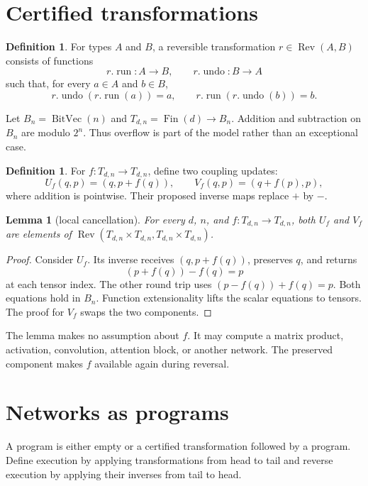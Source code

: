 \documentclass[aop,preprint]{../aop-template/imsart}
\newtheorem{lemma}[theorem]{Lemma}
\theoremstyle{definition}
\newtheorem{definition}[theorem]{Definition}
\newcommand{\Bv}{\operatorname{BitVec}}
\newcommand{\Rev}{\operatorname{Rev}}
\begin{document}
\section{Certified transformations}

\begin{definition}
For types $A$ and $B$, a reversible transformation $r\in\Rev(A,B)$ consists of functions
\[
 r.\operatorname{run}:A\to B,\qquad r.\operatorname{undo}:B\to A
\]
such that, for every $a\in A$ and $b\in B$,
\[
 r.\operatorname{undo}(r.\operatorname{run}(a))=a,
 \qquad
 r.\operatorname{run}(r.\operatorname{undo}(b))=b.
\]
\end{definition}

Let $B_n=\Bv(n)$ and $T_{d,n}=\operatorname{Fin}(d)\to B_n$. Addition and subtraction on $B_n$ are modulo $2^n$. Thus overflow is part of the model rather than an exceptional case.

\begin{definition}
For $f:T_{d,n}\to T_{d,n}$, define two coupling updates:
\[
 U_f(q,p)=(q,p+f(q)),\qquad V_f(q,p)=(q+f(p),p),
\]
where addition is pointwise. Their proposed inverse maps replace $+$ by $-$.
\end{definition}

\begin{lemma}[local cancellation]\label{lem:local}
For every $d$, $n$, and $f:T_{d,n}\to T_{d,n}$, both $U_f$ and $V_f$ are elements of $\Rev(T_{d,n}\times T_{d,n},T_{d,n}\times T_{d,n})$.
\end{lemma}

\begin{proof}
Consider $U_f$. Its inverse receives $(q,p+f(q))$, preserves $q$, and returns
\[
 (p+f(q))-f(q)=p
\]
at each tensor index. The other round trip uses $(p-f(q))+f(q)=p$. Both equations hold in $B_n$. Function extensionality lifts the scalar equations to tensors. The proof for $V_f$ swaps the two components.
\end{proof}

The lemma makes no assumption about $f$. It may compute a matrix product, activation, convolution, attention block, or another network. The preserved component makes $f$ available again during reversal.

\section{Networks as programs}

A program is either empty or a certified transformation followed by a program. Define execution by applying transformations from head to tail and reverse execution by applying their inverses from tail to head.
\end{document}
